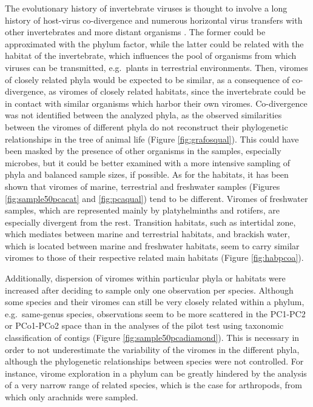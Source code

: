 \documentclass[
  openany]{book}
\begin{document}
The evolutionary history of invertebrate viruses is thought to involve a long history of host-virus co-divergence and numerous horizontal virus transfers with other invertebrates and more distant organisms \autocite{Harvey2022}. The former could be approximated with the phylum factor, while the latter could be related with the habitat of the invertebrate, which influences the pool of organisms from which viruses can be transmitted, e.g.~plants in terrestrial environments. Then, viromes of closely related phyla would be expected to be similar, as a consequence of co-divergence, as viromes of closely related habitats, since the invertebrate could be in contact with similar organisms which harbor their own viromes. Co-divergence was not identified between the analyzed phyla, as the observed similarities between the viromes of different phyla do not reconstruct their phylogenetic relationships in the tree of animal life (Figure \ref{fig:grafosqual}). This could have been masked by the presence of other organisms in the samples, especially microbes, but it could be better examined with a more intensive sampling of phyla and balanced sample sizes, if possible. As for the habitats, it has been shown that viromes of marine, terrestrial and freshwater samples (Figures \ref{fig:sample50pcacat} and \ref{fig:pcaqual}) tend to be different. Viromes of freshwater samples, which are represented mainly by platyhelminths and rotifers, are especially divergent from the rest. Transition habitats, such as intertidal zone, which mediates between marine and terrestrial habitats, and brackish water, which is located between marine and freshwater habitats, seem to carry similar viromes to those of their respective related main habitats (Figure \ref{fig:habpcoa}).

Additionally, dispersion of viromes within particular phyla or habitats were increased after deciding to sample only one observation per species. Although some species and their viromes can still be very closely related within a phylum, e.g.~same-genus species, observations seem to be more scattered in the PC1-PC2 or PCo1-PCo2 space than in the analyses of the pilot test using taxonomic classification of contigs (Figure \ref{fig:sample50pcadiamond}). This is necessary in order to not underestimate the variability of the viromes in the different phyla, although the phylogenetic relationships between species were not controlled. For instance, virome exploration in a phylum can be greatly hindered by the analysis of a very narrow range of related species, which is the case for arthropods, from which only arachnids were sampled.
\end{document}
